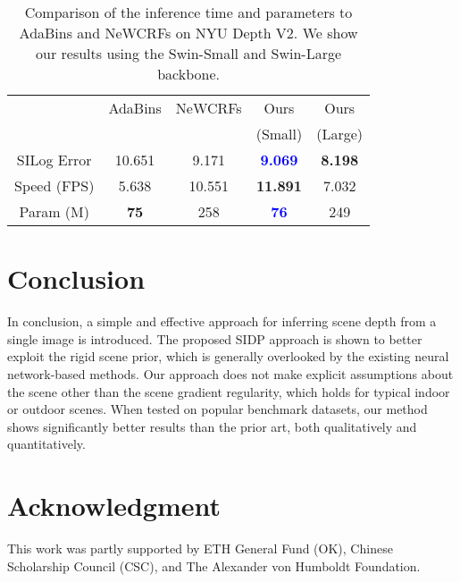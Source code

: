 \documentclass{article} \usepackage{iclr2023_conference, times}
\begin{document}
\begin{table}[h]
\centering
\scriptsize
\caption{\small Comparison of the inference time and parameters to AdaBins and NeWCRFs on NYU Depth V2. We show our results using the Swin-Small and Swin-Large backbone.}
\begin{tabular}{c|cccc}
    \hline
        \multirow{2}{*}{} &  AdaBins
         & NeWCRFs & Ours & Ours \\
        & ~\citep{bhat2021adabins} & ~\citep{yuan2022new} & (Small)& (Large)\\
        \hline
        SILog Error  &  10.651 & 9.171 & \textcolor{blue}{\textbf{9.069}} & \textbf{8.198} \\
        \hline
        Speed (FPS)  & 5.638 & 10.551 & \textbf{11.891} & 7.032\\
        \hline
        Param (M)  &  \textbf{75} & 258 & \textcolor{blue}{\textbf{76}} & 249\\
    \hline
\end{tabular}\label{tab:time}
\end{table}

\section{Conclusion}
In conclusion, a simple and effective approach for inferring scene depth from a single image is introduced. The proposed SIDP approach is shown to better exploit the rigid scene prior, which is generally overlooked by the existing neural network-based methods. Our approach does not make explicit assumptions about the scene other than the scene gradient regularity, which holds for typical indoor or outdoor scenes. When tested on popular benchmark datasets, our method shows significantly better results than the prior art, both qualitatively and quantitatively.


\section{Acknowledgment}
This work was partly supported by ETH General Fund (OK), Chinese Scholarship Council (CSC), and The Alexander von Humboldt Foundation.













\end{document}
